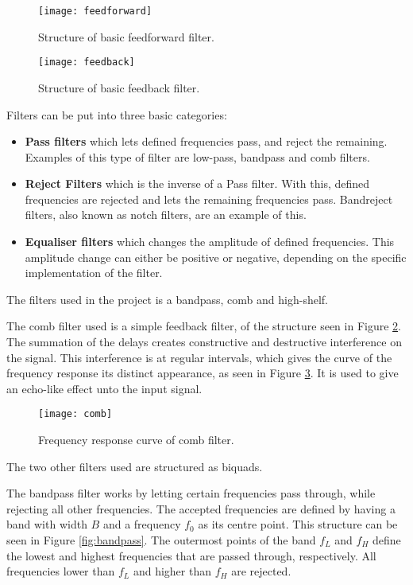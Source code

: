 \begin{figure}
\centering
\texttt{[image: feedforward]}
\caption{Structure of basic feedforward filter.}
\label{fig:feedforward}
\end{figure}

\begin{figure}
\centering
\texttt{[image: feedback]}
\caption{Structure of basic feedback filter.}
\label{fig:feedback}
\end{figure}

Filters can be put into three basic categories:
\begin{itemize}
\item \textbf{Pass filters} which lets defined frequencies pass, and reject the remaining. Examples of this type of filter are low-pass, bandpass and comb filters.
\item \textbf{Reject Filters} which is the inverse of a Pass filter. With this, defined frequencies are rejected and lets the remaining frequencies pass. Bandreject filters, also known as notch filters, are an example of this.
\item \textbf{Equaliser filters} which changes the amplitude of defined frequencies. This amplitude change can either be positive or negative, depending on the specific implementation of the filter. 
\end{itemize}

The filters used in the project is a bandpass, comb and high-shelf.

The comb filter used is a simple feedback filter, of the structure seen in Figure \ref{fig:feedback}. The summation of the delays creates constructive and destructive interference on the signal. This interference is at regular intervals, which gives the curve of the frequency response its distinct appearance, as seen in Figure \ref{fig:comb}. It is used to give an echo-like effect unto the input signal.

\begin{figure}
\centering
\texttt{[image: comb]}
\caption{Frequency response curve of comb filter.}
\label{fig:comb}
\end{figure}

The two other filters used are structured as biquads. 

The bandpass filter works by letting certain frequencies pass through, while rejecting all other frequencies. The accepted frequencies are defined by having a band with width \(B\) and a frequency \(f_0\) as its  centre point. This structure can be seen in Figure \ref{fig:bandpass}. The outermost points of the band \(f_L\) and \(f_H\) define the lowest and highest frequencies that are passed through, respectively. All frequencies lower than \(f_L\) and higher than \(f_H\) are rejected.

